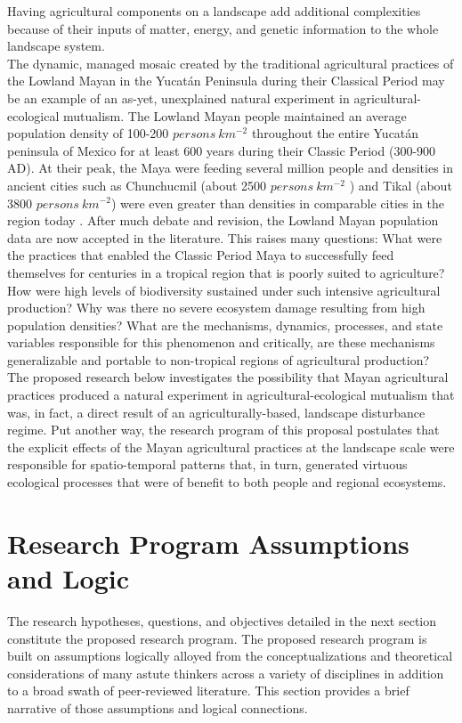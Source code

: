 \documentclass[twoside]{article}	%
\begin{document}
Having agricultural components on a landscape add additional complexities because of their inputs of matter, energy, and genetic information to the whole landscape system. \\

The dynamic, managed mosaic created by the traditional agricultural practices of the Lowland Mayan in the Yucat\'{a}n Peninsula during their Classical Period may be an example of an as-yet, unexplained natural experiment in agricultural-ecological mutualism. The Lowland Mayan people maintained an average population density of 100-200 $persons \ km^{-2}$ throughout the entire Yucat\'{a}n peninsula of Mexico for at least 600 years during their Classic Period (300-900 AD). At their peak, the Maya were feeding several million people \citep{gomez-pompa_lowland_2003} and densities in ancient cities such as Chunchucmil (about 2500  $persons \ km^{-2}$ ) and Tikal (about 3800 $persons \ km^{-2}$) were even greater than densities in comparable cities in the region today \citep{dahlin_reconstructing_2005, faust_maya_2001}.  After much debate and revision, the Lowland Mayan population data are now accepted in the literature. This raises many questions: What were the practices that enabled the Classic Period Maya to successfully feed themselves for centuries in a tropical region that is poorly suited to agriculture?  How were high levels of biodiversity sustained under such intensive agricultural production?  Why was there no severe ecosystem damage resulting from high population densities? What are the mechanisms, dynamics, processes, and state variables responsible for this phenomenon and critically, are these mechanisms generalizable and portable to non-tropical regions of agricultural production? \\

The proposed research below investigates the possibility that Mayan agricultural practices produced a natural experiment in agricultural-ecological mutualism that was, in fact, a direct result of an agriculturally-based, landscape disturbance regime. Put another way, the research program of this proposal postulates that the explicit effects of the Mayan agricultural practices at the landscape scale were responsible for spatio-temporal patterns that, in turn, generated virtuous ecological processes that were of benefit to both people and regional ecosystems.\\ 

\section{Research Program Assumptions and Logic}
The research hypotheses, questions, and objectives detailed in the next section constitute the proposed research program. The proposed research program is built on assumptions logically alloyed from the conceptualizations and theoretical considerations of many astute thinkers across a variety of disciplines in addition to a broad swath of peer-reviewed literature. This section provides a brief narrative of those assumptions and logical connections.\\
\end{document}
